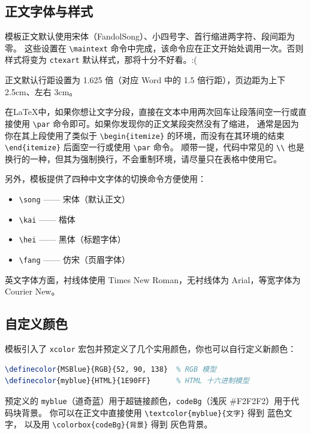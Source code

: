\documentclass{sysu_report}
\begin{document}
\subsection{正文字体与样式}
模板正文默认使用宋体（FandolSong）、小四号字、首行缩进两字符、段间距为零。
这些设置在 \verb|\maintext| 命令中完成，该命令应在正文开始处调用一次。否则样式将变为 \verb|ctexart| 默认样式，那将十分不好看。:(\par
正文默认行距设置为 1.625 倍（对应 Word 中的 1.5 倍行距），页边距为上下 2.5cm、左右 3cm。\par
在\LaTeX{}中，如果你想让文字分段，直接在文本中用两次回车让段落间空一行或直接使用 \verb|\par| 命令即可。如果你发现你的正文某段突然没有了缩进，
通常是因为你在其上段使用了类似于 \verb|\begin{itemize}| 的环境，而没有在其环境的结束 \verb|\end{itemize}| 后面空一行或使用 \verb|\par| 命令。
顺带一提，代码中常见的 \verb|\\| 也是换行的一种，但其为强制换行，不会重制环境，请尽量只在表格中使用它。

另外，模板提供了四种中文字体的切换命令方便使用：
\begin{itemize}
    \item \verb|\song| —— {\song{}宋体（默认正文）}
    \item \verb|\kai|  —— {\kai{}楷体}
    \item \verb|\hei|  —— {\hei{}黑体（标题字体）}
    \item \verb|\fang| —— {\fang{}仿宋（页眉字体）}
\end{itemize}\par
英文字体方面，衬线体使用 Times New Roman，无衬线体为 Arial，等宽字体为 Courier New。\par
\subsection{自定义颜色}
模板引入了 \texttt{xcolor} 宏包并预定义了几个实用颜色，你也可以自行定义新颜色：
\begin{lstlisting}[language=TeX]
% 使用\definecolor{名称}{模型}{色值}自定义颜色
\definecolor{MSBlue}{RGB}{52, 90, 138}  % RGB 模型
\definecolor{myblue}{HTML}{1E90FF}      % HTML 十六进制模型
\end{lstlisting}
预定义的 \texttt{myblue}（道奇蓝）用于超链接颜色，\texttt{codeBg}（浅灰 \#F2F2F2）用于代码块背景。
你可以在正文中直接使用 \verb|\textcolor{myblue}{文字}| 得到 {\color{myblue} 蓝色文字}，
以及用 \verb|\colorbox{codeBg}{背景}| 得到 \colorbox{codeBg}{灰色背景}。
\end{document}
